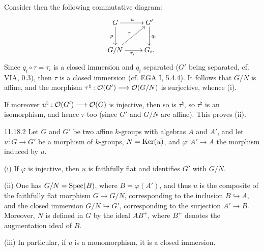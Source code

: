Consider then the following commutative diagram:
\[
\xymatrix{G\ar[r]^u\ar[d]_p&G'\ar[d]^{q_i}\\G/N\ar[r]_{\tau_i}\ar[ur]^\tau&G_i.}
\]
Since $q_i\circ\tau=\tau_i$ is a closed immersion and $q_i$ separated ($G'$ being separated, cf. VIA, 0.3), then $\tau$ is a closed immersion (cf. EGA I, 5.4.4). It follows that $G/N$ is affine, and the morphism $\tau^\natural:\mathcal{O}(G')\longrightarrow\mathcal{O}(G/N)$ is surjective, whence (i).

If moreover $u^\natural:\mathcal{O}(G')\longrightarrow\mathcal{O}(G)$ is injective, then so is $\tau^\natural$, so $\tau^\natural$ is an isomorphism, and hence $\tau$ too (since $G'$ and $G/N$ are affine). This proves (ii).

\begin{theorem}{11.18.2}\label{VIB.11.18.2}
Let $G$ and $G'$ be two affine $k$-groups with algebras $A$ and $A'$, and let $u:G\to G'$ be a morphism of $k$-groups, $N=\operatorname{Ker}(u)$, and $\varphi:A'\to A$ the morphism induced by $u$.

(i) If $\varphi$ is injective, then $u$ is faithfully flat and identifies $G'$ with $G/N$.

(ii) One has $G/N=\operatorname{Spec}(B)$, where $B=\varphi(A')$, and thus $u$ is the composite of the faithfully flat morphism $G\to G/N$, corresponding to the inclusion $B\hookrightarrow A$, and the closed immersion $G/N\hookrightarrow G'$, corresponding to the surjection $A'\to B$. Moreover, $N$ is defined in $G$ by the ideal $AB^+$, where $B^+$ denotes the augmentation ideal of $B$.

(iii) In particular, if $u$ is a monomorphism, it is a closed immersion.
\end{theorem}

